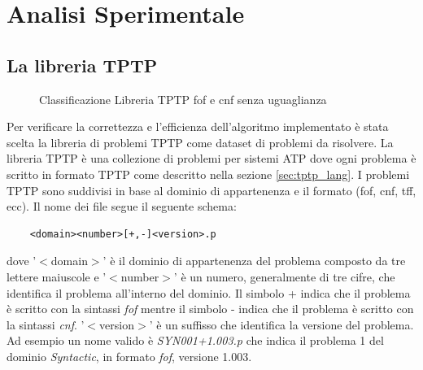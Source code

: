 \documentclass[./main.tex]{subfiles}
\begin{document}
\chapter{Analisi Sperimentale}
\section{La libreria TPTP}
\begin{figure}[h]
    \centering
    \caption{Classificazione Libreria TPTP fof e cnf senza uguaglianza}
    \label{fig:classificazione_tptp}
\end{figure}

Per verificare la correttezza e l'efficienza dell'algoritmo implementato è stata scelta 
la libreria di problemi TPTP \cite{tptpLib} come dataset di problemi da risolvere. 
La libreria TPTP è una collezione di problemi per sistemi ATP dove ogni problema è scritto in formato
TPTP come descritto nella sezione \ref{sec:tptp_lang}.
I problemi TPTP sono suddivisi in base al dominio di appartenenza e il formato (fof, cnf, tff, ecc).
Il nome dei file segue il seguente schema:
\begin{verbatim}
    <domain><number>[+,-]<version>.p
\end{verbatim}

dove '$<$domain$>$' è il dominio di appartenenza del problema composto da tre lettere maiuscole e
'$<$number$>$' è un numero, generalmente di tre cifre, che identifica il problema all'interno del dominio.
Il simbolo + indica che il problema è scritto con la sintassi \textit{fof} mentre il simbolo - indica
che il problema è scritto con la sintassi \textit{cnf}. '$<$version$>$' è un suffisso che
identifica la versione del problema.
Ad esempio un nome valido è \textit{SYN001+1.003.p} che indica il problema 1 del dominio \textit{Syntactic},
in formato \textit{fof}, versione 1.003. 
\end{document}
